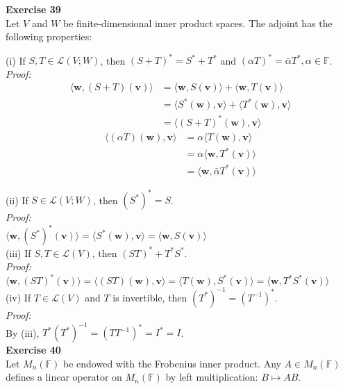 \documentclass[letterpaper,12pt]{article}
\let\vec\mathbf
\theoremstyle{definition}
\begin{document}
\textbf{Exercise 39} \\
Let $V$ and $W$ be finite-dimensional inner product spaces. The adjoint has the following properties:

(i) If $S,T \in \mathscr{L}(V;W)$, then $(S+T)^* = S^* + T^*$ and $(\alpha T)^* = \bar{\alpha}T^*, \alpha \in \mathbb{F}$. \\
\textit{Proof:}
\begin{align*}
  \langle \vec{w}, (S+T)(\vec{v}) \rangle &= \langle \vec{w}, S(\vec{v}) \rangle + \langle \vec{w}, T(\vec{v}) \rangle \\
  &= \langle S^*(\vec{w}), \vec{v} \rangle + \langle T^*(\vec{w}), \vec{v} \rangle \\
  &= \langle (S+T)^*(\vec{w}), \vec{v} \rangle
\end{align*}
\begin{align*}
  \langle (\alpha T)(\vec{w}), \vec{v} \rangle &= \alpha \langle  T(\vec{w}), \vec{v} \rangle \\
  &= \alpha \langle \vec{w}, T^*(\vec{v}) \rangle \\
  &= \langle \vec{w}, \bar{\alpha} T^*(\vec{v}) \rangle
\end{align*}


(ii) If $S \in \mathscr{L}(V;W)$, then $(S^*)^*=S$. \\
\textit{Proof:}\\
$\langle \vec{w}, (S^*)^* (\vec{v}) \rangle = \langle S^*(\vec{w}),  \vec{v} \rangle = \langle \vec{w}, S(\vec{v}) \rangle$ \\

(iii) If $S,T \in \mathscr{L}(V)$, then $(ST)^* + T^*S^*$. \\
\textit{Proof:} \\
$\langle \vec{w}, (ST)^*(\vec{v}) \rangle = \langle (ST)(\vec{w}), \vec{v} \rangle = \langle T(\vec{w}), S^*(\vec{v}) \rangle = \langle \vec{w}, T^*S^*(\vec{v}) \rangle$ \\

(iv) If $T \in \mathscr{L}(V)$ and $T$ is invertible, then $(T^*)^{-1} = (T^{-1})^*$. \\
\textit{Proof:} \\
By (iii),
$T^*(T^*)^{-1} = (TT^{-1})^* = I^* = I$. \\

\textbf{Exercise 40} \\
Let $M_n(\mathbb{F})$ be endowed with the Frobenius inner product. Any $A \in M_n(\mathbb{F})$ defines a linear operator on $M_n(\mathbb{F})$ by left multiplication: $B \mapsto AB$.
\end{document}

